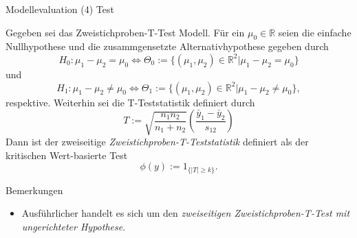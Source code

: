 \documentclass[
  8pt,
  ignorenonframetext,
]{beamer}
\providecommand{\tightlist}{%
  \setlength{\itemsep}{0pt}\setlength{\parskip}{0pt}}
\begin{document}
\begin{frame}{Modellevaluation}
\protect\hypertarget{modellevaluation-28}{}
\noindent (4) Test

\footnotesize
\begin{definition}
\justifying
Gegeben sei das Zweistichproben-T-Test Modell. Für ein $\mu_0 \in \mathbb{R}$ seien
die einfache Nullhypothese und die zusammgensetzte Alternativhypothese gegeben durch
\begin{equation}
H_0 : \mu_1 - \mu_2 = \mu_0
\Leftrightarrow
\Theta_0 := \{(\mu_1,\mu_2) \in \mathbb{R}^2|\mu_1 - \mu_2 = \mu_0\}
\end{equation}
und
\begin{equation}
H_1 : \mu_1 - \mu_2 \neq \mu_0
\Leftrightarrow
\Theta_1 := \{(\mu_1,\mu_2) \in \mathbb{R}^2|\mu_1 - \mu_2 \neq \mu_0\},
\end{equation}
respektive. Weiterhin sei die T-Teststatistik definiert durch
\begin{equation}
T := \sqrt{\frac{n_1n_2}{n_1+n_2}}\left(\frac{\bar{y}_1-\bar{y}_2}{s_{12}}\right)
\end{equation}
Dann ist der zweiseitige \textit{Zweistichproben-T-Teststatistik} definiert als
der kritischen Wert-basierte Test
\begin{equation}
\phi(y) := 1_{\{|T| \ge k\}}.
\end{equation}
\end{definition}

Bemerkungen

\begin{itemize}
\tightlist
\item
  Ausführlicher handelt es sich um den \emph{zweiseitigen
  Zweistichproben-T-Test mit ungerichteter Hypothese}.
\end{itemize}
\end{frame}
\end{document}
